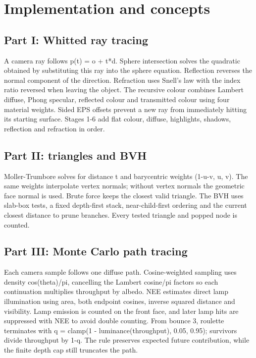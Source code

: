 \documentclass[11pt,a4paper]{article}
\begin{document}
\section{Implementation and concepts}
\subsection*{Part I: Whitted ray tracing}
A camera ray follows p(t) = o + t*d. Sphere intersection solves the quadratic obtained by substituting this ray into the sphere equation. Reflection reverses the normal component of the direction. Refraction uses Snell's law with the index ratio reversed when leaving the object. The recursive colour combines Lambert diffuse, Phong specular, reflected colour and transmitted colour using four material weights. Sided EPS offsets prevent a new ray from immediately hitting its starting surface. Stages 1-6 add flat colour, diffuse, highlights, shadows, reflection and refraction in order.


\subsection*{Part II: triangles and BVH}
Moller-Trumbore solves for distance t and barycentric weights (1-u-v, u, v). The same weights interpolate vertex normals; without vertex normals the geometric face normal is used. Brute force keeps the closest valid triangle. The BVH uses slab-box tests, a fixed depth-first stack, near-child-first ordering and the current closest distance to prune branches. Every tested triangle and popped node is counted.


\subsection*{Part III: Monte Carlo path tracing}
Each camera sample follows one diffuse path. Cosine-weighted sampling uses density cos(theta)/\allowbreak{}pi, cancelling the Lambert cosine/\allowbreak{}pi factors so each continuation multiplies throughput by albedo. NEE estimates direct lamp illumination using area, both endpoint cosines, inverse squared distance and visibility. Lamp emission is counted on the front face, and later lamp hits are suppressed with NEE to avoid double counting. From bounce 3, roulette terminates with q = clamp(1 - luminance(throughput), 0.05, 0.95); survivors divide throughput by 1-q. The rule preserves expected future contribution, while the finite depth cap still truncates the path.
\end{document}
